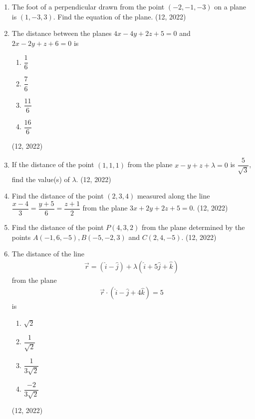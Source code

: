 \begin{enumerate}[label=\thesubsection.\arabic*, ref=\thesubsection.\theenumi]
\item The foot of a perpendicular drawn from the point $(-2,-1,-3)$ on a plane is $(1,-3,3)$. Find the equation of the plane. \hfill (12, 2022)
\item The distance between the planes $4x-4y+2z+5=0$ and $2x-2y+z+6=0$ is
	\begin{enumerate}
		\item $\dfrac{1}{6}$
		\item $\dfrac{7}{6}$
		\item $\dfrac{11}{6}$
		\item $\dfrac{16}{6}$
	\end{enumerate}
\hfill (12, 2022)
\item If the distance of the point $(1,1,1)$ from the plane $x-y+z+\lambda=0$ is $\dfrac{5}{\sqrt{3}}$, find the value(s) of $\lambda$. \hfill (12, 2022)

\item Find the distance of the point $(2,3,4)$ measured along the line $\dfrac{x-4}{3}=\dfrac{y+5}{6}=\dfrac{z+1}{2}$ from the plane $3x+2y+2z+5=0$. \hfill (12, 2022)

\item Find the distance of the point $P(4,3,2)$ from the plane determined by the points $A(-1,6,-5),B(-5,-2,3)$ and $C(2,4,-5)$. \hfill (12, 2022)

\item The distance of the line
	\begin{align}
		\vec{r}=(\hat{i}-\hat{j})+\lambda(\hat{i}+5\hat{j}+\hat{k})
	\end{align}
	from the plane
	\begin{align}
		\vec{r}\cdot(\hat{i}-\hat{j}+4\hat{k})=5
	\end{align}
	is
	\begin{enumerate}
		\item $\sqrt{2}$
		\item $\dfrac{1}{\sqrt{2}}$
		\item $\dfrac{1}{3\sqrt{2}}$
		\item $\dfrac{-2}{3\sqrt{2}}$
	\end{enumerate}
\hfill (12, 2022)


\end{enumerate}
